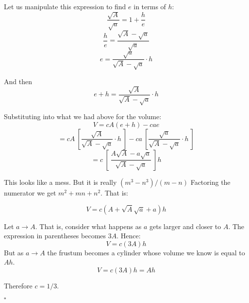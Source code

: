 \documentclass[11pt, oneside]{article}
\begin{document}
Let us manipulate this expression to find $e$ in terms of $h$:
\[ \frac{\sqrt{A}}{\sqrt{a}} = 1 + \frac{h}{e} \]
\[ \frac{h}{e} = \frac{\sqrt{A} - \sqrt{a}}{\sqrt{a}} \]
\[ e = \frac{\sqrt{a}}{\sqrt{A} - \sqrt{a}} \cdot h \]

And then
\[ e + h = \frac{\sqrt{A}}{\sqrt{A} - \sqrt{a}} \cdot h \]

Substituting into what we had above for the volume:
\[ V = cA(e+h) - cae \]
\[ = cA \ [ \frac{\sqrt{A}}{\sqrt{A} - \sqrt{a}} \cdot h \ ] - ca \ [ \frac{\sqrt{a}}{\sqrt{A} - \sqrt{a}}  \cdot h \ ] \]
\[ = c \ [ \   \frac{A \sqrt{A} - a \sqrt{a}}{\sqrt{A} - \sqrt{a}} \ ] h \]

This looks like a mess.  But it is really $(m^3 - n^3)/(m-n)$  Factoring the numerator we get $m^2 + mn + n^2$.  That is:

\[ V = c (A + \sqrt{A} \sqrt{a} + a) h \]

Let $a \rightarrow A$.  That is, consider what happens as $a$ gets larger and closer to $A$. The expression in parentheses becomes $3A$.  Hence:
\[ V = c(3A)h \]
But as $a \rightarrow A$ the frustum becomes a cylinder whose volume we know is equal to $Ah$. 
\[ V = c(3A)h = Ah \]

Therefore $c = 1/3$.

$\square$
\end{document}
